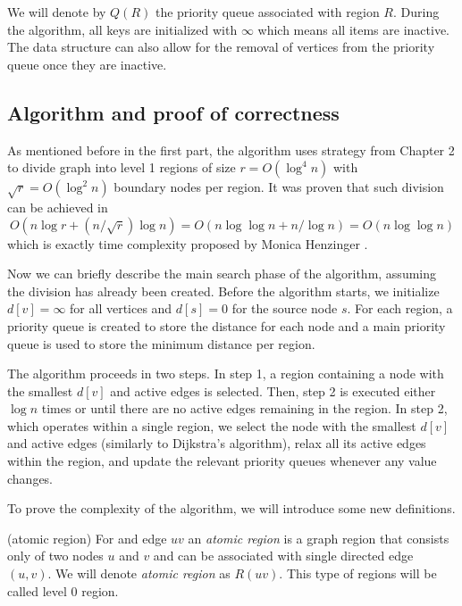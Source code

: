 We will denote by $Q(R)$ the priority queue associated with region $R$. During the algorithm, all keys are initialized with $\infty$ which means all items are inactive. The data structure can also allow for the removal of vertices from the priority queue once they are inactive.

\subsection{Algorithm and proof of correctness}

As mentioned before in the first part, the algorithm uses strategy from Chapter 2 to divide graph into level 1 regions of size $r = O(\log^4n)$ with $\sqrt{r} = O(\log^2 n)$ boundary nodes per region. It was proven that such division can be achieved in $$O(n \log r + (n/\sqrt{r})\log n) = O(n\log \log n + n/\log n) = O(n \log \log n)$$ which is exactly time complexity proposed by Monica Henzinger \cite{henzinger}.

Now we can briefly describe the main search phase of the algorithm, assuming the division has already been created. Before the algorithm starts, we initialize $d[v] = \infty$ for all vertices and $d[s] = 0$ for the source node $s$. For each region, a priority queue is created to store the distance for each node and a  main priority queue is used to store the minimum distance per region.

The algorithm proceeds in two steps. In step 1, a region containing a node with the smallest $d[v]$ and active edges is selected. Then, step 2 is executed either $\log n$ times or until there are no active edges remaining in the region. In step 2, which operates within a single region, we select the node with the smallest $d[v]$ and active edges (similarly to Dijkstra's algorithm), relax all its active edges within the region, and update the relevant priority queues whenever any value changes.

To prove the complexity of the algorithm, we will introduce some new definitions.
\begin{defn}(atomic region)
For and edge $u v$ an \emph{atomic region} is a graph region that consists only of two nodes $u$ and $v$ and can be associated with single directed edge $(u,v)$. We will denote \emph{atomic region} as $R(u v)$. This type of regions will be called level 0 region.
\end{defn}

